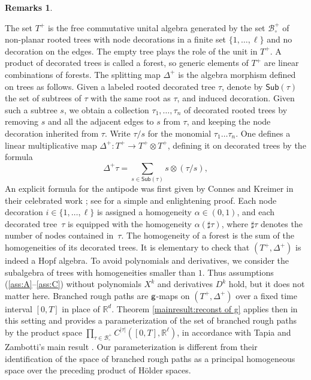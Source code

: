 \documentclass[10pt]{amsart}
\theoremstyle{plain}
\theoremstyle{definition}
\newtheorem*{remarks*} {Remarks}
\newcommand{\bbR}{\mathbb{R}}
\newcommand{\mcB}{\mathcal{B}}
\begin{document}
\begin{remarks*}
\begin{enumerate}
The set $T^+$ is the free commutative unital algebra generated by the set $\mcB^+_\circ$ of non-planar rooted trees with node decorations in a finite set $\{1,\dots,\ell\}$ and no decoration on the edges. The empty tree plays the role of the unit in $T^+$. A product of decorated trees is called a forest, so generic elements of $T^+$ are linear combinations of forests. The splitting map $\Delta^+$ is the algebra morphism defined on trees as follows. Given a labeled rooted decorated tree $\tau$, denote by $\textsf{Sub}(\tau)$ the set of subtrees of $\tau$ with the same root as $\tau$, and induced decoration. Given such a subtree $s$, we obtain a collection $\tau_1,\dots,\tau_n$ of decorated rooted trees by removing $s$ and all the adjacent edges to $s$ from $\tau$, and keeping the node decoration inherited from $\tau$. Write $\tau/s$ for the monomial $\tau_1\dots\tau_n$. One defines a linear multiplicative map $\Delta^+ : T^+ \to T^+\otimes T^+$, defining it on decorated trees by the formula\vspace*{-3pt}
\[
\Delta^+\tau = \sum_{s\in\textsf{Sub}(\tau)} s\otimes (\tau/s),
\]
An explicit formula for the antipode was first given by Connes and Kreimer in their celebrated work \cite{CK}; see \cite{CHV} for a simple and enlightening proof. Each node decoration $i\in\{1,\dots,\ell\}$ is assigned a homogeneity $\alpha\in(0,1)$,
and each decorated tree~$\tau$ is equipped with the homogeneity $\alpha(\sharp\tau)$, where $\sharp\tau$ denotes the number of nodes \hbox{contained} in~$\tau$. The homogeneity of a forest is the sum of the homogeneities of its decorated trees. It is elementary to check that $(T^+,\Delta^+)$ is indeed a Hopf algebra. To avoid polynomials and derivatives, we consider the subalgebra of trees with homo\-geneities smaller than $1$. Thus assumptions (\ref{ass:A}--\ref{ass:C}) without polynomials $X^k$ and derivatives $D^k$ hold, but it does not matter here.
Branched rough paths are $\sf g$-maps on $(T^+,\Delta^+)$ over a fixed time interval $[0,T]$ in place of $\bbR^d$. Theorem \ref{mainresult:reconst of g} applies then in this setting and provides a parameterization of the set of branched rough paths by the product space $\prod_{\tau\in\mcB_\circ^+} C^{\vert\tau\vert}([0,T], \bbR^\ell)$, in accordance with Tapia and Zambotti's main result \cite[Th.\,1.2 \& Cor.\,1.3]{TZ18}. Our parameterization is different from their identification of the space of branched rough paths as a principal homogeneous space over the preceding product of Hölder spaces.


\end{enumerate}
\end{remarks*}
\end{document}

